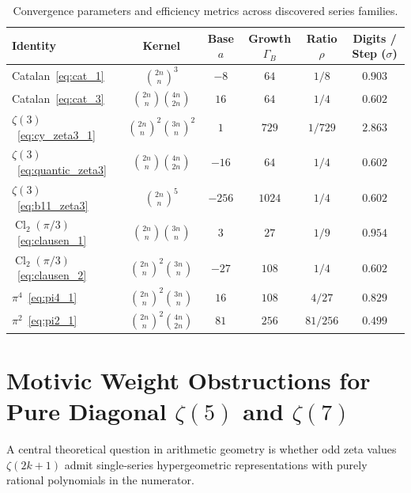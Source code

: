\documentclass[11pt,a4paper]{article}
\theoremstyle{definition}
\DeclareMathOperator{\Cl}{Cl}
\begin{document}
\begin{table}[h!]
\centering
\small
\begin{tabular}{lccccc}
\toprule
\textbf{Identity} & \textbf{Kernel} & \textbf{Base $a$} & \textbf{Growth $\Gamma_B$} & \textbf{Ratio $\rho$} & \textbf{Digits / Step ($\sigma$)} \\
\midrule
Catalan~\eqref{eq:cat_1} & $\binom{2n}{n}^3$ & $-8$ & $64$ & $1/8$ & $\mathbf{0.903}$ \\
Catalan~\eqref{eq:cat_3} & $\binom{2n}{n}\binom{4n}{2n}$ & $16$ & $64$ & $1/4$ & $\mathbf{0.602}$ \\
$\zeta(3)$~\eqref{eq:cy_zeta3_1} & $\binom{2n}{n}^2\binom{3n}{n}^2$ & $1$ & $729$ & $1/729$ & $\mathbf{2.863}$ \\
$\zeta(3)$~\eqref{eq:quantic_zeta3} & $\binom{2n}{n}\binom{4n}{2n}$ & $-16$ & $64$ & $1/4$ & $\mathbf{0.602}$ \\
$\zeta(3)$~\eqref{eq:b11_zeta3} & $\binom{2n}{n}^5$ & $-256$ & $1024$ & $1/4$ & $\mathbf{0.602}$ \\
$\Cl_2(\pi/3)$~\eqref{eq:clausen_1} & $\binom{2n}{n}\binom{3n}{n}$ & $3$ & $27$ & $1/9$ & $\mathbf{0.954}$ \\
$\Cl_2(\pi/3)$~\eqref{eq:clausen_2} & $\binom{2n}{n}^2\binom{3n}{n}$ & $-27$ & $108$ & $1/4$ & $\mathbf{0.602}$ \\
$\pi^4$~\eqref{eq:pi4_1} & $\binom{2n}{n}^2\binom{3n}{n}$ & $16$ & $108$ & $4/27$ & $\mathbf{0.829}$ \\
$\pi^2$~\eqref{eq:pi2_1} & $\binom{2n}{n}^2\binom{4n}{2n}$ & $81$ & $256$ & $81/256$ & $\mathbf{0.499}$ \\
\bottomrule
\end{tabular}
\caption{Convergence parameters and efficiency metrics across discovered series families.}
\label{tab:convergence}
\end{table}

\section{Motivic Weight Obstructions for Pure Diagonal $\zeta(5)$ and $\zeta(7)$}

A central theoretical question in arithmetic geometry is whether odd zeta values $\zeta(2k+1)$ admit single-series hypergeometric representations with purely rational polynomials in the numerator.
\end{document}

